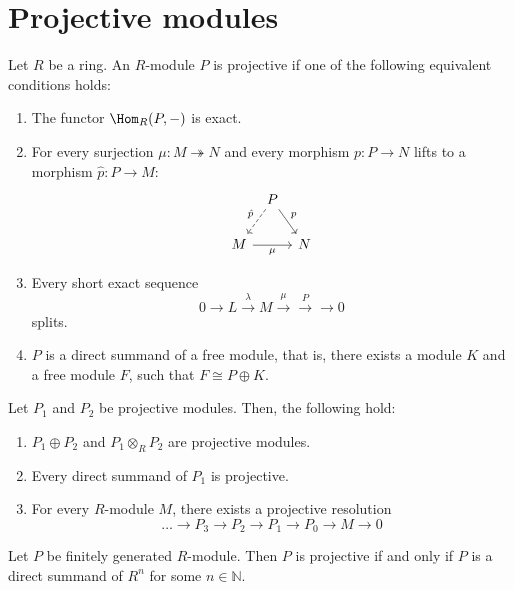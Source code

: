 \section{Projective modules}

\newcommand\dash{-}

\begin{definition}
  Let $R$ be a ring.
  An $R$-module $P$ is projective if one of the following equivalent
  conditions holds:
   \begin{enumerate}[p]
    \item The functor $\Hom_R(P, \dash)$ is exact.
    \item For every surjection $\mu \colon  M \twoheadrightarrow N$
      and every morphism $p\colon P \to N$ lifts to a morphism
      $\hat{p} \colon  P \to  M$:
      \[
      \begin{tikzcd}[column sep = tiny]
      & P \ar[swap,dashed]{dl}{\hat{p}} \ar{dr}{p} \\
      M \ar[swap]{rr}{\mu} & & N
      \end{tikzcd}
      \]
    \item Every short exact sequence
      \[
      0 \to  L \xrightarrow{λ} M \xrightarrow{\mu} \xrightarrow{P} \to 0
      \] 
      splits.
    \item $P$ is a direct summand of a free module,
      that is, there exists a module $K$ and a free module  $F$,
      such that  $F \cong P \oplus K$.
  \end{enumerate}
\end{definition}

\begin{lemma}
  Let $P_1$ and $P_2$ be projective modules.
  Then, the following hold:
  \begin{enumerate}[h]
    \item
      $P_1 \oplus P_2$ and $P_1 \otimes _R P_2$
      are projective modules.
    \item Every direct summand of $P_1$ is projective.
    \item For every $R$-module  $M$, there exists a projective resolution
       \[
      \ldots \to P_3 \to P_2 \to P_1 \to P_0 \to  M \to  0
      \] 
  \end{enumerate}
\end{lemma}

\begin{lemma}
  Let $P$ be finitely generated $R$-module.
  Then  $P$ is projective if and only if  $P$ is a direct summand
  of  $R^n$ for some $n\in \mathbb{N}$.
\end{lemma}

